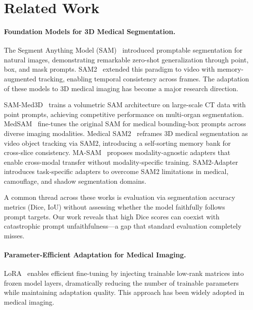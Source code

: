 \section{Related Work}

\paragraph{Foundation Models for 3D Medical Segmentation.}
The Segment Anything Model (SAM)~\citep{kirillov2023sam} introduced promptable segmentation for natural images, demonstrating remarkable zero-shot generalization through point, box, and mask prompts. SAM2~\citep{ravi2024sam2} extended this paradigm to video with memory-augmented tracking, enabling temporal consistency across frames. The adaptation of these models to 3D medical imaging has become a major research direction.

SAM-Med3D~\citep{wang2023sam_med3d} trains a volumetric SAM architecture on large-scale CT data with point prompts, achieving competitive performance on multi-organ segmentation. MedSAM~\citep{ma2024medsam} fine-tunes the original SAM for medical bounding-box prompts across diverse imaging modalities. Medical SAM2~\citep{zhu2024medsam2} reframes 3D medical segmentation as video object tracking via SAM2, introducing a self-sorting memory bank for cross-slice consistency. MA-SAM~\citep{chen2024masam} proposes modality-agnostic adapters that enable cross-modal transfer without modality-specific training. SAM2-Adapter~\citep{chen2024sam2adapter} introduces task-specific adapters to overcome SAM2 limitations in medical, camouflage, and shadow segmentation domains.

A common thread across these works is evaluation via segmentation accuracy metrics (Dice, IoU) without assessing whether the model faithfully follows prompt targets. Our work reveals that high Dice scores can coexist with catastrophic prompt unfaithfulness---a gap that standard evaluation completely misses.

\paragraph{Parameter-Efficient Adaptation for Medical Imaging.}
LoRA~\citep{hu2022lora} enables efficient fine-tuning by injecting trainable low-rank matrices into frozen model layers, dramatically reducing the number of trainable parameters while maintaining adaptation quality. This approach has been widely adopted in medical imaging.

